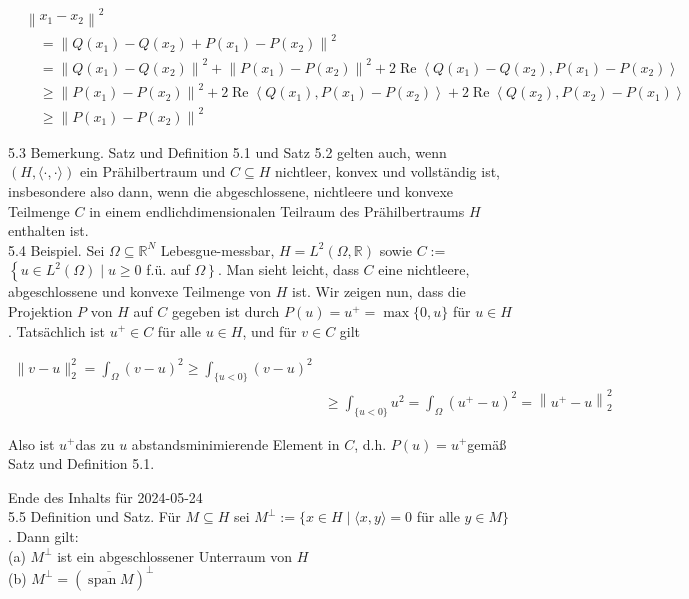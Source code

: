 \documentclass[10pt, letterpaper]{article}
\begin{document}
$$
\begin{aligned}
& \left\|x_{1}-x_{2}\right\|^{2} \\
& \quad=\left\|Q\left(x_{1}\right)-Q\left(x_{2}\right)+P\left(x_{1}\right)-P\left(x_{2}\right)\right\|^{2} \\
& \quad=\left\|Q\left(x_{1}\right)-Q\left(x_{2}\right)\right\|^{2}+\left\|P\left(x_{1}\right)-P\left(x_{2}\right)\right\|^{2}+2 \operatorname{Re}\left\langle Q\left(x_{1}\right)-Q\left(x_{2}\right), P\left(x_{1}\right)-P\left(x_{2}\right)\right\rangle \\
& \quad \geq\left\|P\left(x_{1}\right)-P\left(x_{2}\right)\right\|^{2}+2 \operatorname{Re}\left\langle Q\left(x_{1}\right), P\left(x_{1}\right)-P\left(x_{2}\right)\right\rangle+2 \operatorname{Re}\left\langle Q\left(x_{2}\right), P\left(x_{2}\right)-P\left(x_{1}\right)\right\rangle \\
& \quad \geq\left\|P\left(x_{1}\right)-P\left(x_{2}\right)\right\|^{2}
\end{aligned}
$$

5.3 Bemerkung. Satz und Definition 5.1 und Satz 5.2 gelten auch, wenn $(H,\langle\cdot, \cdot\rangle)$ ein Prähilbertraum und $C \subseteq H$ nichtleer, konvex und vollständig ist, insbesondere also dann, wenn die abgeschlossene, nichtleere und konvexe Teilmenge $C$ in einem endlichdimensionalen Teilraum des Prähilbertraums $H$ enthalten ist.\\
5.4 Beispiel. Sei $\Omega \subseteq \mathbb{R}^{N}$ Lebesgue-messbar, $H=L^{2}(\Omega, \mathbb{R})$ sowie $C:=$ $\left\{u \in L^{2}(\Omega) \mid u \geq 0\right.$ f.ü. auf $\left.\Omega\right\}$. Man sieht leicht, dass $C$ eine nichtleere, abgeschlossene und konvexe Teilmenge von $H$ ist. Wir zeigen nun, dass die Projektion $P$ von $H$ auf $C$ gegeben ist durch $P(u)=u^{+}=\max \{0, u\}$ für $u \in H$. Tatsächlich ist $u^{+} \in C$ für alle $u \in H$, und für $v \in C$ gilt

$$
\begin{aligned}
\|v-u\|_{2}^{2}=\int_{\Omega}(v-u)^{2} \geq \int_{\{u<0\}}(v-u)^{2} & \\
& \geq \int_{\{u<0\}} u^{2}=\int_{\Omega}\left(u^{+}-u\right)^{2}=\left\|u^{+}-u\right\|_{2}^{2}
\end{aligned}
$$

Also ist $u^{+}$das zu $u$ abstandsminimierende Element in $C$, d.h. $P(u)=u^{+}$gemäß Satz und Definition 5.1.

Ende des Inhalts für 2024-05-24\\
5.5 Definition und Satz. Für $M \subseteq H$ sei $M^{\perp}:=\{x \in H \mid\langle x, y\rangle=0$ für alle $y \in M\}$. Dann gilt:\\
(a) $M^{\perp}$ ist ein abgeschlossener Unterraum von $H$\\
(b) $M^{\perp}=(\overline{\operatorname{span} M})^{\perp}$
\end{document}
